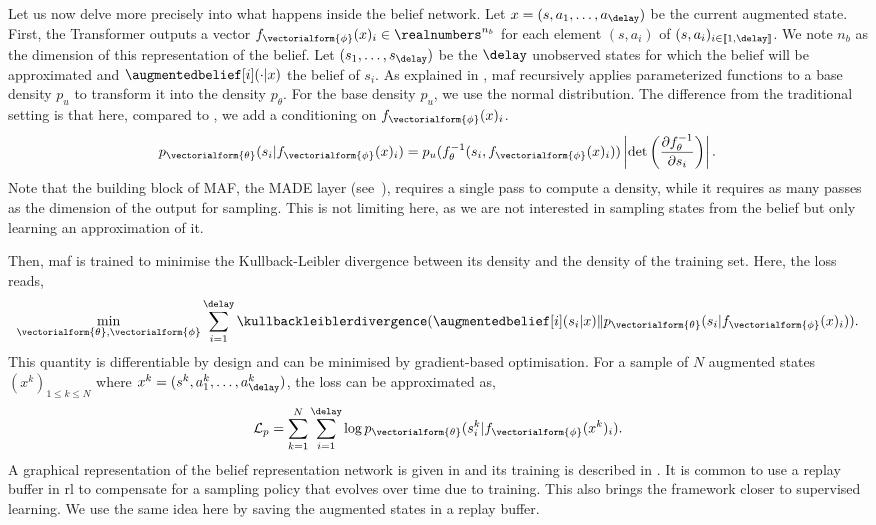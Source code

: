 Let us now delve more precisely into what happens inside the belief network.
Let $x=(s,a_1,\dots,a_{\delay})$ be the current augmented state. First, the Transformer outputs a vector $f_{\vectorialform{\phi}}(x)_i\in\realnumbers^{n_b}$ for each element $(s,a_{i})$ of $(s,a_{i})_{i \in [\![1,\delay]\!]}$. 
We note $n_b$ as the dimension of this representation of the belief. 
Let $(s_1,\dots,s_{\delay})$ be the $\delay$ unobserved states for which the belief will be approximated and $\augmentedbelief[i](\cdot\vert x)$ the belief of $s_i$. 
As explained in , \gls{maf} recursively applies parameterized functions to a base density $p_u$ to transform it into the density $p_{\theta}$.  
For the base density $p_u$, we use the normal distribution.
The difference from the traditional setting is that here, compared to , we add a conditioning on $f_{\vectorialform{\phi}}({x})_i$.
\begin{align*}
    p_{\vectorialform{\theta}}(s_i\vert f_{\vectorialform{\phi}}({x})_i) = p_u(f_\theta^{-1}(s_i,f_{\vectorialform{\phi}}({x})_i)) \left\lvert \det\left(\frac{\partial f_\theta^{-1}}{\partial s_i}\right)\right\rvert.
\end{align*}
Note that the building block of MAF, the MADE layer (see~), requires a single pass to compute a density, while it requires as many passes as the dimension of the output for sampling. 
This is not limiting here, as we are not interested in sampling states from the belief but only learning an approximation of it. 

Then, \gls{maf} is trained to minimise the Kullback-Leibler divergence between its density and the density of the training set. 
Here, the loss reads,
\begin{align*}
    \min_{\vectorialform{\theta},\vectorialform{\phi}} \sum_{i=1}^\delay \kullbackleiblerdivergence( \augmentedbelief[i](s_i \vert  x) \Vert p_{\vectorialform{\theta}}(s_i\vert f_{\vectorialform{\phi}}({x})_i)).
\end{align*}
This quantity is differentiable by design and can be minimised by gradient-based optimisation.
For a sample of $N$ augmented states $(x^k)_{1\le k\le N}$ where $x^k=(s^k,a^k_1,\dots,a^k_{\delay})$, the loss can be approximated as,
\begin{align}
\label{eq:loss_maf}
    \mathcal{L}_p = \sum_{k=1}^N \sum_{i=1}^\delay \log p_{\vectorialform{\theta}}(s^{k}_{i}\vert f_{\vectorialform{\phi}}(x^k)_i). 
\end{align}
A graphical representation of the belief representation network is given in  and its training is described in .
It is common to use a replay buffer in \gls{rl} to compensate for a sampling policy that evolves over time due to training.
This also brings the framework closer to supervised learning. 
We use the same idea here by saving the augmented states in a replay buffer. 

